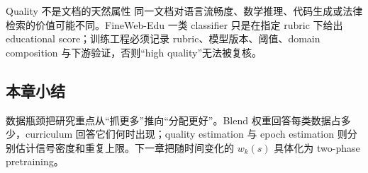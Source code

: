 \begin{warningbox}{Quality 不是文档的天然属性}
同一文档对语言流畅度、数学推理、代码生成或法律检索的价值可能不同。FineWeb-Edu 一类 classifier 只是在指定 rubric 下给出 educational score；训练工程必须记录 rubric、模型版本、阈值、domain composition 与下游验证，否则“high quality”无法被复核。
\end{warningbox}

\subsection{本章小结}

数据瓶颈把研究重点从“抓更多”推向“分配更好”。Blend 权重回答每类数据占多少，curriculum 回答它们何时出现；quality estimation 与 epoch estimation 则分别估计信号密度和重复上限。下一章把随时间变化的 $w_k(s)$ 具体化为 two-phase pretraining。

